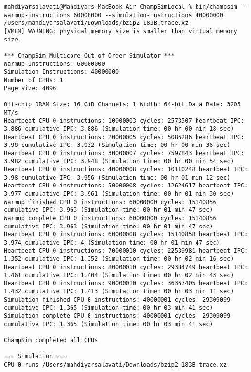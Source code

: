 \documentclass[17pt]{article}
\begin{document}
\begin{LTR}
\begin{lstlisting}[basicstyle=\tiny\ttfamily]
	mahdiyarsalavati@Mahdiyars-MacBook-Air ChampSimLocal % bin/champsim --warmup-instructions 60000000 --simulation-instructions 40000000 /Users/mahdiyarsalavati/Downloads/bzip2_183B.trace.xz
[VMEM] WARNING: physical memory size is smaller than virtual memory size.

*** ChampSim Multicore Out-of-Order Simulator ***
Warmup Instructions: 60000000
Simulation Instructions: 40000000
Number of CPUs: 1
Page size: 4096

Off-chip DRAM Size: 16 GiB Channels: 1 Width: 64-bit Data Rate: 3205 MT/s
Heartbeat CPU 0 instructions: 10000003 cycles: 2573507 heartbeat IPC: 3.886 cumulative IPC: 3.886 (Simulation time: 00 hr 00 min 18 sec)
Heartbeat CPU 0 instructions: 20000005 cycles: 5086286 heartbeat IPC: 3.98 cumulative IPC: 3.932 (Simulation time: 00 hr 00 min 36 sec)
Heartbeat CPU 0 instructions: 30000007 cycles: 7597843 heartbeat IPC: 3.982 cumulative IPC: 3.948 (Simulation time: 00 hr 00 min 54 sec)
Heartbeat CPU 0 instructions: 40000008 cycles: 10110248 heartbeat IPC: 3.98 cumulative IPC: 3.956 (Simulation time: 00 hr 01 min 12 sec)
Heartbeat CPU 0 instructions: 50000008 cycles: 12624617 heartbeat IPC: 3.977 cumulative IPC: 3.961 (Simulation time: 00 hr 01 min 30 sec)
Warmup finished CPU 0 instructions: 60000000 cycles: 15140856 cumulative IPC: 3.963 (Simulation time: 00 hr 01 min 47 sec)
Warmup complete CPU 0 instructions: 60000000 cycles: 15140856 cumulative IPC: 3.963 (Simulation time: 00 hr 01 min 47 sec)
Heartbeat CPU 0 instructions: 60000008 cycles: 15140858 heartbeat IPC: 3.974 cumulative IPC: 4 (Simulation time: 00 hr 01 min 47 sec)
Heartbeat CPU 0 instructions: 70000010 cycles: 22539981 heartbeat IPC: 1.352 cumulative IPC: 1.352 (Simulation time: 00 hr 02 min 16 sec)
Heartbeat CPU 0 instructions: 80000010 cycles: 29384749 heartbeat IPC: 1.461 cumulative IPC: 1.404 (Simulation time: 00 hr 02 min 43 sec)
Heartbeat CPU 0 instructions: 90000010 cycles: 36367405 heartbeat IPC: 1.432 cumulative IPC: 1.413 (Simulation time: 00 hr 03 min 11 sec)
Simulation finished CPU 0 instructions: 40000001 cycles: 29309099 cumulative IPC: 1.365 (Simulation time: 00 hr 03 min 41 sec)
Simulation complete CPU 0 instructions: 40000001 cycles: 29309099 cumulative IPC: 1.365 (Simulation time: 00 hr 03 min 41 sec)

ChampSim completed all CPUs

=== Simulation ===
CPU 0 runs /Users/mahdiyarsalavati/Downloads/bzip2_183B.trace.xz


\end{lstlisting}
\end{LTR}
\end{document}
